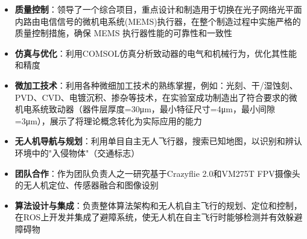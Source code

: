 \begin{itemize}
\footnotesize 
  \item \textbf{质量控制}：领导了一个综合项目，重点设计和制造用于切换在光子网络光平面内路由电信信号的微机电系统(MEMS)执行器，在整个制造过程中实施严格的质量控制措施，确保 MEMS 执行器性能的可靠性和一致性
  \item \textbf{仿真与优化}：利用COMSOL仿真分析致动器的电气和机械行为，优化其性能和精度
  \item \textbf{微加工技术}：利用各种微细加工技术的熟练掌握，例如：光刻、干/湿蚀刻、PVD、CVD、电镀沉积、掺杂等技术，在实验室成功制造出了符合要求的微机电系统致动器（器件层厚度=30μm，最小特征尺寸=4μm，最小间隙=3μm），展示了将理论概念转化为实际应用的能力
\end{itemize}

\begin{itemize}
\footnotesize
  \item \textbf{无人机导航与规划}：利用单目自主无人飞行器，搜索已知地图，以识别和辨认环境中的"入侵物体"（交通标志）
  \item \textbf{团队合作}：作为团队负责人之一研究基于Crazyflie 2.0和VM275T FPV摄像头的无人机定位、传感器融合和图像设别
  \item \textbf{算法设计与集成}：负责整体算法架构和无人机自主飞行的规划、定位和控制，在ROS上开发并集成了避障系统，使无人机在自主飞行时能够检测并有效躲避障碍物
\end{itemize}

